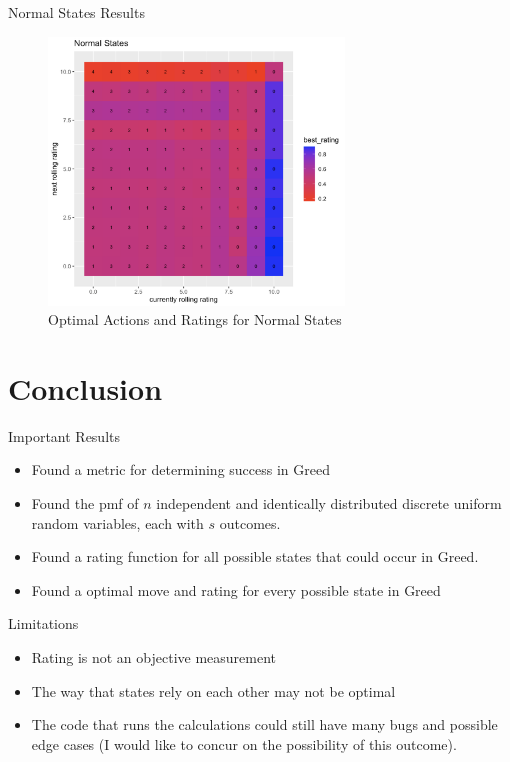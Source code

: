 \documentclass{beamer}
\begin{document}
\begin{frame}{Normal States Results}
    \begin{figure}[h]
        \centering
        \includegraphics[width=0.7\textwidth]{Screenshot 2023-12-14 at 01.43.15.png}
        \caption{Optimal Actions and Ratings for Normal States}
    \end{figure}
\end{frame}

\section{Conclusion}

\begin{frame}{Important Results}
    \begin{itemize}{}
        \item Found a metric for determining success in Greed
        \item Found the pmf of $n$ independent and identically distributed discrete uniform random variables, each with $s$ outcomes. 
        \item Found a rating function for all possible states that could occur in Greed.
        \item Found a optimal move and rating for every possible state in Greed
    \end{itemize}
\end{frame}

\begin{frame}{Limitations}
    \begin{itemize}{}
        \item Rating is not an objective measurement
        \item The way that states rely on each other may not be optimal
        \item The code that runs the calculations could still have many bugs and possible edge cases (I would like to concur on the possibility of this outcome).
    \end{itemize}
\end{frame}
\end{document}
